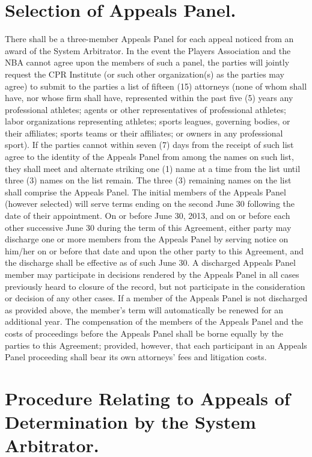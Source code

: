 \documentclass[
]{book}
\begin{document}
\hypertarget{selection-of-appeals-panel.}{%
\section{Selection of Appeals Panel.}\label{selection-of-appeals-panel.}}

There shall be a three-member Appeals Panel for each appeal noticed from an award of the System Arbitrator. In the event the Players Association and the NBA cannot agree upon the members of such a panel, the parties will jointly request the CPR Institute (or such other organization(s) as the parties may agree) to submit to the parties a list of fifteen (15) attorneys (none of whom shall have, nor whose firm shall have, represented within the past five (5) years any professional athletes; agents or other representatives of professional athletes; labor organizations representing athletes; sports leagues, governing bodies, or their affiliates; sports teams or their affiliates; or owners in any professional sport). If the parties cannot within seven (7) days from the receipt of such list agree to the identity of the Appeals Panel from among the names on such list, they shall meet and alternate striking one (1) name at a time from the list until three (3) names on the list remain. The three (3) remaining names on the list shall comprise the Appeals Panel. The initial members of the Appeals Panel (however selected) will serve terms ending on the second June 30 following the date of their appointment. On or before June 30, 2013, and on or before each other successive June 30 during the term of this Agreement, either party may discharge one or more members from the Appeals Panel by serving notice on him/her on or before that date and upon the other party to this Agreement, and the discharge shall be effective as of such June 30. A discharged Appeals Panel member may participate in decisions rendered by the Appeals Panel in all cases previously heard to closure of the record, but not participate in the consideration or decision of any other cases. If a member of the Appeals Panel is not discharged as provided above, the member's term will automatically be renewed for an additional year. The compensation of the members of the Appeals Panel and the costs of proceedings before the Appeals Panel shall be borne equally by the parties to this Agreement; provided, however, that each participant in an Appeals Panel proceeding shall bear its own attorneys' fees and litigation costs.

\hypertarget{procedure-relating-to-appeals-of-determination-by-the-system-arbitrator.}{%
\section{Procedure Relating to Appeals of Determination by the System Arbitrator.}\label{procedure-relating-to-appeals-of-determination-by-the-system-arbitrator.}}
\end{document}
